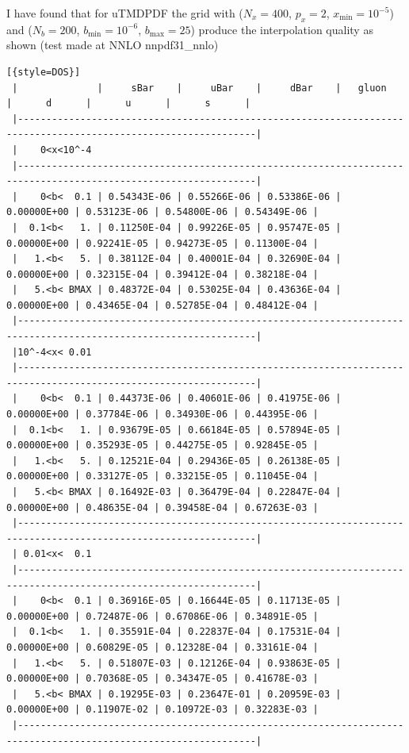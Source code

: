\documentclass[prd,nofootinbib,eqsecnum,final]{revtex4}
\renewcommand{\(}{\left(}
\renewcommand{\)}{\right)}
\renewcommand{\[}{\left[}
\renewcommand{\]}{\right]}
\begin{document}
I have found that for uTMDPDF the grid with ($N_x=400$, $p_x=2$, $x_{\min}=10^{-5}$) and ($N_b=200$, $b_{\min}=10^{-6}$, $b_{\max}=25$) produce the interpolation quality as shown (test made at NNLO nnpdf31\_nnlo)
\begin{lstlisting}[{style=DOS}]
 |              |     sBar    |     uBar    |     dBar    |   gluon     |      d      |      u      |      s      |
 |----------------------------------------------------------------------------------------------------------------|
 |    0<x<10^-4
 |----------------------------------------------------------------------------------------------------------------|
 |    0<b<  0.1 | 0.54343E-06 | 0.55266E-06 | 0.53386E-06 | 0.00000E+00 | 0.53123E-06 | 0.54800E-06 | 0.54349E-06 |
 |  0.1<b<   1. | 0.11250E-04 | 0.99226E-05 | 0.95747E-05 | 0.00000E+00 | 0.92241E-05 | 0.94273E-05 | 0.11300E-04 |
 |   1.<b<   5. | 0.38112E-04 | 0.40001E-04 | 0.32690E-04 | 0.00000E+00 | 0.32315E-04 | 0.39412E-04 | 0.38218E-04 |
 |   5.<b< BMAX | 0.48372E-04 | 0.53025E-04 | 0.43636E-04 | 0.00000E+00 | 0.43465E-04 | 0.52785E-04 | 0.48412E-04 |
 |----------------------------------------------------------------------------------------------------------------|
 |10^-4<x< 0.01
 |----------------------------------------------------------------------------------------------------------------|
 |    0<b<  0.1 | 0.44373E-06 | 0.40601E-06 | 0.41975E-06 | 0.00000E+00 | 0.37784E-06 | 0.34930E-06 | 0.44395E-06 |
 |  0.1<b<   1. | 0.93679E-05 | 0.66184E-05 | 0.57894E-05 | 0.00000E+00 | 0.35293E-05 | 0.44275E-05 | 0.92845E-05 |
 |   1.<b<   5. | 0.12521E-04 | 0.29436E-05 | 0.26138E-05 | 0.00000E+00 | 0.33127E-05 | 0.33215E-05 | 0.11045E-04 |
 |   5.<b< BMAX | 0.16492E-03 | 0.36479E-04 | 0.22847E-04 | 0.00000E+00 | 0.48635E-04 | 0.39458E-04 | 0.67263E-03 |
 |----------------------------------------------------------------------------------------------------------------|
 | 0.01<x<  0.1
 |----------------------------------------------------------------------------------------------------------------|
 |    0<b<  0.1 | 0.36916E-05 | 0.16644E-05 | 0.11713E-05 | 0.00000E+00 | 0.72487E-06 | 0.67086E-06 | 0.34891E-05 |
 |  0.1<b<   1. | 0.35591E-04 | 0.22837E-04 | 0.17531E-04 | 0.00000E+00 | 0.60829E-05 | 0.12328E-04 | 0.33161E-04 |
 |   1.<b<   5. | 0.51807E-03 | 0.12126E-04 | 0.93863E-05 | 0.00000E+00 | 0.70368E-05 | 0.34347E-05 | 0.41678E-03 |
 |   5.<b< BMAX | 0.19295E-03 | 0.23647E-01 | 0.20959E-03 | 0.00000E+00 | 0.11907E-02 | 0.10972E-03 | 0.32283E-03 |
 |----------------------------------------------------------------------------------------------------------------|

\end{lstlisting}
\end{document}
